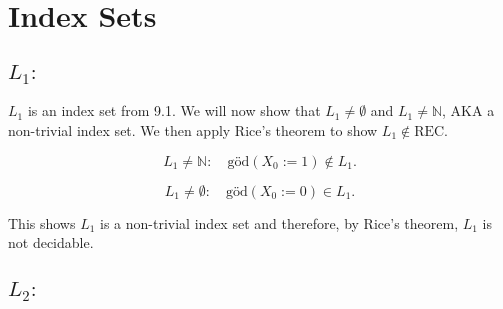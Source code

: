 

\setcounter{section}{1}


\section{Index Sets}

\subsection{$L_1:$}
$L_1$ is an index set from 9.1. We will now show that $L_1 \neq \emptyset$ and $L_1 \neq \mathbb{N}$, AKA a non-trivial index set.  
We then apply Rice's theorem to show $L_1 \notin \text{REC}$.

\[
L_1 \neq \mathbb{N}: \quad \text{göd}(X_0 := 1) \notin L_1.
\]

\[
L_1 \neq \emptyset: \quad \text{göd}(X_0 := 0) \in L_1.
\]

This shows $L_1$ is a non-trivial index set and therefore, by Rice's theorem, $L_1$ is not decidable.

\subsection{$L_2:$}


